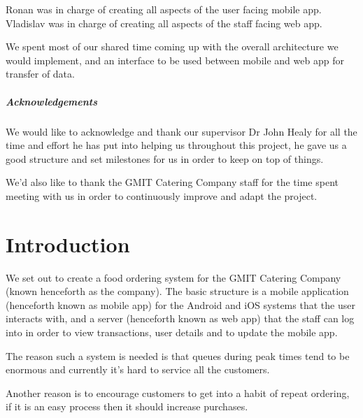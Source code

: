 Ronan was in charge of creating all aspects of the user facing mobile app. 
Vladislav was in charge of creating all aspects of the staff facing web app.
\linebreak

We spent most of our shared time coming up with the overall architecture we would implement, and an interface to be used between mobile and web app for transfer of data.


\pagebreak
\paragraph{Acknowledgements}
We would like to acknowledge and thank our supervisor Dr John Healy for all the time and effort he has put into helping us throughout this project, he gave us a good structure and set milestones for us in order to keep on top of things.
\linebreak

We'd also like to thank the GMIT Catering Company staff for the time spent meeting with us in order to continuously improve and adapt the project.

\chapter{Introduction}	%



We set out to create a food ordering system for the GMIT Catering Company (known henceforth as the company).
The basic structure is a mobile application (henceforth known as mobile app) for the Android and iOS systems that the user interacts with, and a server (henceforth known as web app) that the staff can log into in order to view transactions, user details and to update the mobile app.

The reason such a system is needed is that queues during peak times tend to be enormous and currently it's hard to service all the customers.

Another reason is to encourage customers to get into a habit of repeat ordering, if it is an easy process then it should increase purchases.

